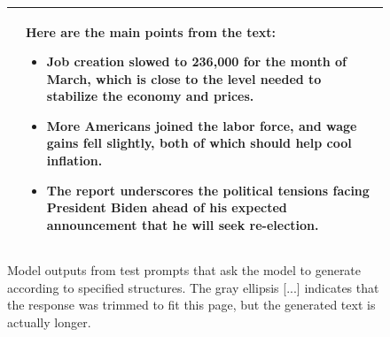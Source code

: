 \begin{figure}[p]
\begin{tabular}{@{}p{}p{}@{}}
     &
     Here are the main points from the text:
     \begin{itemize}[leftmargin=8pt]
\item Job creation slowed to 236,000 for the month of March, which is close to the level needed to stabilize the economy and prices.
\item More Americans joined the labor force, and wage gains fell slightly, both of which should help cool inflation.
\item The report underscores the political tensions facing President Biden ahead of his expected announcement that he will seek re-election.
\end{itemize}\\
    \bottomrule
    \end{tabular}
    \caption{Model outputs from test prompts that ask the model to generate according to specified structures. The gray ellipsis \textcolor[HTML]{808080}{[...]} indicates that the response was trimmed to fit this page, but the generated text is actually longer.}
    \label{fig:structure_examples}
    
\end{figure}